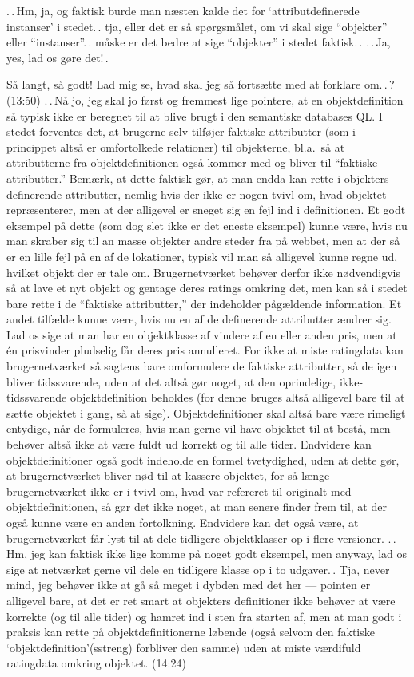 \documentclass{report}
\begin{document}
.\,.\,Hm, ja, og faktisk burde man næsten kalde det for `attributdefinerede instanser' i stedet.\,. tja, eller det er så spørgsmålet, om vi skal sige ``objekter'' eller ``instanser''.\,. måske er det bedre at sige ``objekter'' i stedet faktisk.\,. .\,.\,Ja, yes, lad os gøre det!\,. 

Så langt, så godt! Lad mig se, hvad skal jeg så fortsætte med at forklare om.\,.\,? (13:50) .\,.\,Nå jo, jeg skal jo først og fremmest lige pointere, at en objektdefinition så typisk ikke er beregnet til at blive brugt i den semantiske databases QL. I stedet forventes det, at brugerne selv tilføjer faktiske attributter (som i princippet altså er omfortolkede relationer) til objekterne, bl.a.\ så at attributterne fra objektdefinitionen også kommer med og bliver til ``faktiske attributter.'' Bemærk, at dette faktisk gør, at man endda kan rette i objekters definerende attributter, nemlig hvis der ikke er nogen tvivl om, hvad objektet repræsenterer, men at der alligevel er sneget sig en fejl ind i definitionen. Et godt eksempel på dette (som dog slet ikke er det eneste eksempel) kunne være, hvis nu man skraber sig til an masse objekter andre steder fra på webbet, men at der så er en lille fejl på en af de lokationer, %
typisk vil man så alligevel kunne regne ud, hvilket objekt der er tale om. Brugernetværket behøver derfor ikke nødvendigvis så at lave et nyt objekt og gentage deres ratings omkring det, men kan så i stedet bare rette i de ``faktiske attributter,'' der indeholder pågældende information. Et andet tilfælde kunne være, hvis nu en af de definerende attributter ændrer sig. Lad os sige at man har en objektklasse af vindere af en eller anden pris, men at én prisvinder pludselig får deres pris annulleret. For ikke at miste ratingdata kan brugernetværket så sagtens bare omformulere de faktiske attributter, så de igen bliver tidssvarende, uden at det altså gør noget, at den oprindelige, ikke-tidssvarende objektdefinition beholdes (for denne bruges altså alligevel bare til at sætte objektet i gang, så at sige). Objektdefinitioner skal altså bare være rimeligt entydige, når de formuleres, hvis man gerne vil have objektet til at bestå, men behøver altså ikke at være fuldt ud korrekt og til alle tider. Endvidere kan objektdefinitioner også godt indeholde en formel tvetydighed, uden at dette gør, at brugernetværket bliver nød til at kassere objektet, for så længe brugernetværket ikke er i tvivl om, hvad var refereret til originalt med objektdefinitionen, så gør det ikke noget, at man senere finder frem til, at der også kunne være en anden fortolkning. Endvidere kan det også være, at brugernetværket får lyst til at dele tidligere objektklasser op i flere versioner. .\,.\,Hm, jeg kan faktisk ikke lige komme på noget godt eksempel, men anyway, lad os sige at netværket gerne vil dele en tidligere klasse op i to udgaver.\,. Tja, never mind, jeg behøver ikke at gå så meget i dybden med det her --- pointen er alligevel bare, at det er ret smart at objekters definitioner ikke behøver at være korrekte (og til alle tider) og hamret ind i sten fra starten af, men at man godt i praksis kan rette på objektdefinitionerne løbende (også selvom den faktiske `objektdefinition'(sstreng) forbliver den samme) uden at miste værdifuld ratingdata omkring objektet. (14:24)
\end{document}
